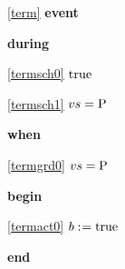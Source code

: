 \noindent \ref{term}  \textbf{event}
\begin{block}
  \item   \textbf{during}
  \begin{block}
  \item[ \eqref{termsch0} ]\sout{$\text{true}$} %
  \end{block}
  \begin{block}
  \item[ \eqref{termsch1} ]{$vs = \text{P}$} %
  \end{block}
  \item   \textbf{when}
  \begin{block}
  \item[ \eqref{termgrd0} ]{$vs = \text{P}$} %
  \end{block}
  \item   \textbf{begin}
  \begin{block}
  \item[ \eqref{termact0} ]{$b \mathrel{:\mkern1mu=} \text{true}$} %
  \end{block}
  \item   \textbf{end} \\
\end{block}

